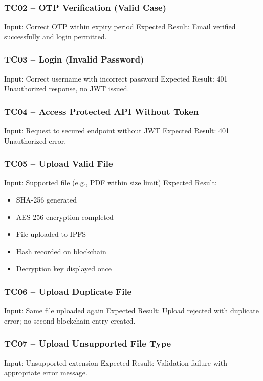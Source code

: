 \documentclass[12pt]{article}
\begin{document}
\subsubsection{TC02 -- OTP Verification (Valid Case)} 
Input: Correct OTP within expiry period \newline
Expected Result: Email verified successfully and login permitted.

\subsubsection{TC03 -- Login (Invalid Password)} 
Input: Correct username with incorrect password \newline
Expected Result: 401 Unauthorized response, no JWT issued.

\subsubsection{TC04 -- Access Protected API Without Token} 
Input: Request to secured endpoint without JWT \newline
Expected Result: 401 Unauthorized error.

\subsubsection{TC05 -- Upload Valid File} 
Input: Supported file (e.g., PDF within size limit) \newline
Expected Result:
\begin{itemize}
\item SHA-256 generated
\item AES-256 encryption completed
\item File uploaded to IPFS
\item Hash recorded on blockchain
\item Decryption key displayed once
\end{itemize}

\subsubsection{TC06 -- Upload Duplicate File} 
Input: Same file uploaded again \newline
Expected Result: Upload rejected with duplicate error; no second blockchain entry created.

\subsubsection{TC07 -- Upload Unsupported File Type} 
Input: Unsupported extension \newline
Expected Result: Validation failure with appropriate error message.
\end{document}
